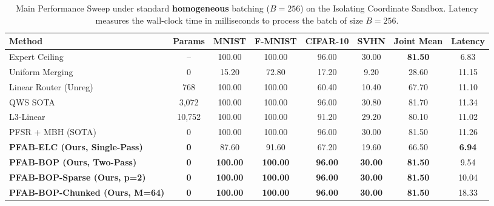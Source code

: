 \begin{table}[t]
  \caption{Main Performance Sweep under standard \textbf{homogeneous} batching ($B=256$) on the Isolating Coordinate Sandbox. Latency measures the wall-clock time in milliseconds to process the batch of size $B=256$.}
  \label{tab:homogeneous}
  \vskip 0.15in
  \begin{center}
  \begin{small}
  \begin{sc}
  \setlength{\tabcolsep}{3.5pt}
  \begin{tabular}{lccccccc}
    \toprule
    Method & Params & MNIST & F-MNIST & CIFAR-10 & SVHN & Joint Mean & Latency \\
    \midrule
    Expert Ceiling & -- & 100.00 & 100.00 & 96.00 & 30.00 & \textbf{81.50} & 6.83 \\
    Uniform Merging & 0 & 15.20 & 72.80 & 17.20 & 9.20 & 28.60 & 11.15 \\
    Linear Router (Unreg) & 768 & 100.00 & 100.00 & 60.40 & 10.40 & 67.70 & 11.10 \\
    QWS SOTA \cite{qws2025} & 3,072 & 100.00 & 100.00 & 96.00 & 30.80 & 81.70 & 11.34 \\
    L3-Linear & 10,752 & 100.00 & 100.00 & 91.20 & 29.20 & 80.10 & 11.02 \\
    PFSR + MBH (SOTA) \cite{subspace2026} & 0 & 100.00 & 100.00 & 96.00 & 30.00 & 81.50 & 11.26 \\
    \midrule
    \textbf{PFAB-ELC (Ours, Single-Pass)} & \textbf{0} & 87.60 & 91.60 & 67.20 & 19.60 & 66.50 & \textbf{6.94} \\
    \textbf{PFAB-BOP (Ours, Two-Pass)} & \textbf{0} & \textbf{100.00} & \textbf{100.00} & \textbf{96.00} & \textbf{30.00} & \textbf{81.50} & 9.54 \\
    \textbf{PFAB-BOP-Sparse (Ours, p=2)} & \textbf{0} & \textbf{100.00} & \textbf{100.00} & \textbf{96.00} & \textbf{30.00} & \textbf{81.50} & 10.04 \\
    \textbf{PFAB-BOP-Chunked (Ours, M=64)} & \textbf{0} & \textbf{100.00} & \textbf{100.00} & \textbf{96.00} & \textbf{30.00} & \textbf{81.50} & 18.33 \\
    \bottomrule
  \end{tabular}
  \end{sc}
  \end{small}
  \end{center}
  \vskip -0.1in
\end{table}

